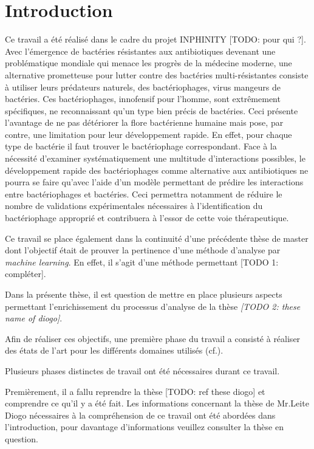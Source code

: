\chapter{Introduction}
\label{ch:introduction}

Ce travail a été réalisé dans le cadre du projet INPHINITY [TODO: pour qui ?]. Avec l'émergence de bactéries résistantes aux antibiotiques devenant une problématique mondiale qui menace les progrès de la médecine moderne, une alternative prometteuse pour lutter contre des bactéries multi-résistantes consiste à utiliser leurs prédateurs naturels, des bactériophages, virus mangeurs de bactéries. Ces bactériophages, innofensif pour l'homme, sont extrêmement spécifiques, ne reconnaissant qu'un type bien précis de bactéries. Ceci présente l'avantage de ne pas détériorer la flore bactérienne humaine mais pose, par contre, une limitation pour leur développement rapide. En effet, pour chaque type de bactérie il faut trouver le bactériophage correspondant. Face à la nécessité d'examiner systématiquement une multitude d'interactions possibles, le développement rapide des bactériophages comme alternative aux antibiotiques ne pourra se faire qu'avec l'aide d'un modèle permettant de prédire les interactions entre bactériophages et bactéries. Ceci permettra notamment de réduire le nombre de validations expérimentales nécessaires à l'identification du bactériophage approprié et contribuera à l'essor de cette voie thérapeutique.

Ce travail se place également dans la continuité d'une précédente thèse de master dont l'objectif était de prouver la pertinence d'une méthode d'analyse par \emph{machine learning}. En effet, il s'agit d'une méthode permettant [TODO 1: compléter].

Dans la présente thèse, il est question de mettre en place plusieurs aspects permettant l'enrichissement du processus d'analyse de la thèse \emph{[TODO 2: these name of diogo]}. 

Afin de réaliser ces objectifs, une première phase du travail a consisté à réaliser des états de l'art pour les différents domaines utilisés (cf.).

Plusieurs phases distinctes de travail ont été nécessaires durant ce travail.

Premièrement, il a fallu reprendre la thèse [TODO: ref these diogo] et comprendre ce qu'il y a été fait. Les informations concernant la thèse de Mr.Leite Diogo nécessaires à la compréhension de ce travail ont été abordées dans l'introduction, pour davantage d'informations veuillez consulter la thèse en question.

